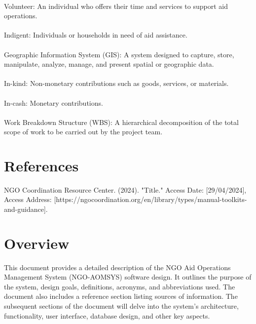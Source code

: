 \documentclass[a4paper,12pt]{report}
\begin{document}
     			\paragraph{}Volunteer: An individual who offers their time and services to support aid operations.
			\paragraph{}Indigent: Individuals or households in need of aid assistance.
   			\paragraph{}Geographic Information System (GIS): A system designed to capture, store, manipulate, analyze, manage, and present spatial or geographic data.
      			\paragraph{}In-kind: Non-monetary contributions such as goods, services, or materials.
	 		\paragraph{}In-cash: Monetary contributions.
    			\paragraph{}Work Breakdown Structure (WBS): A hierarchical decomposition of the total scope of work to be carried out by the project team.
		\section{References}
  			\paragraph{} NGO Coordination Resource Center. (2024). "Title." Access Date: [29/04/2024], Access Address: [https://ngocoordination.org/en/library/types/manual-toolkits-and-guidance].
		\section{Overview}
  			\paragraph{}This document provides a detailed description of the NGO Aid Operations Management System (NGO-AOMSYS) software design. It outlines the purpose of the system, design goals, definitions, acronyms, and abbreviations used. The document also includes a reference section listing sources of information. The subsequent sections of the document will delve into the system's architecture, functionality, user interface, database design, and other key aspects.
\end{document}

